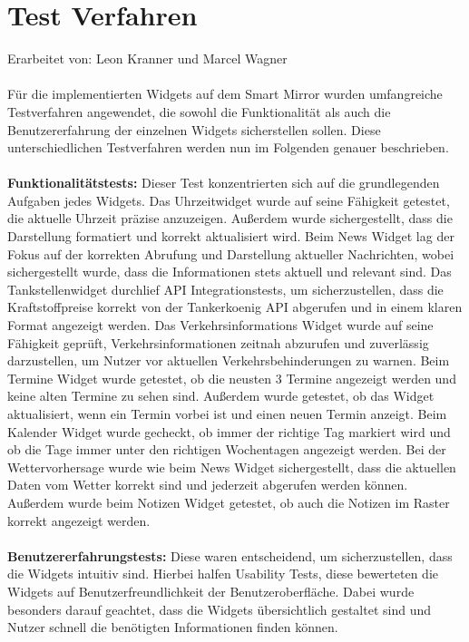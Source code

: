 \newpage

\section{Test Verfahren}
Erarbeitet von: Leon Kranner und Marcel Wagner \\ \\
\noindent
Für die implementierten Widgets auf dem Smart Mirror wurden umfangreiche Testverfahren angewendet, die sowohl die Funktionalität als auch die Benutzererfahrung der einzelnen Widgets sicherstellen sollen. Diese unterschiedlichen Testverfahren werden nun im Folgenden genauer beschrieben. \\ \\
\noindent
\textbf{Funktionalitätstests:} Dieser Test konzentrierten sich auf die grundlegenden Aufgaben jedes Widgets. Das Uhrzeitwidget wurde auf seine Fähigkeit getestet, die aktuelle Uhrzeit präzise anzuzeigen. Außerdem wurde sichergestellt, dass die Darstellung formatiert und korrekt aktualisiert wird. Beim News Widget lag der Fokus auf der korrekten Abrufung und Darstellung aktueller Nachrichten, wobei sichergestellt wurde, dass die Informationen stets aktuell und relevant sind. Das Tankstellenwidget durchlief API Integrationstests, um sicherzustellen, dass die Kraftstoffpreise korrekt von der Tankerkoenig API abgerufen und in einem klaren Format angezeigt werden. Das Verkehrsinformations Widget wurde auf seine Fähigkeit geprüft, Verkehrsinformationen zeitnah abzurufen und zuverlässig darzustellen, um Nutzer vor aktuellen Verkehrsbehinderungen zu warnen. Beim Termine Widget wurde getestet, ob die neusten 3 Termine angezeigt werden und keine alten Termine zu sehen sind. Außerdem wurde getestet, ob das Widget aktualisiert, wenn ein Termin vorbei ist und einen neuen Termin anzeigt. Beim Kalender Widget wurde gecheckt, ob immer der richtige Tag markiert wird und ob die Tage immer unter den richtigen Wochentagen angezeigt werden. Bei der Wettervorhersage wurde wie beim News Widget sichergestellt, dass die aktuellen Daten vom Wetter korrekt sind und jederzeit abgerufen werden können.  Außerdem wurde beim Notizen Widget getestet, ob auch die Notizen im Raster korrekt angezeigt werden.\\ \\
\noindent
\textbf{Benutzererfahrungstests:} Diese waren entscheidend, um sicherzustellen, dass die Widgets intuitiv sind. Hierbei halfen Usability Tests, diese bewerteten die Widgets auf Benutzerfreundlichkeit der Benutzeroberfläche. Dabei wurde besonders darauf geachtet, dass die Widgets übersichtlich gestaltet sind und Nutzer schnell die benötigten Informationen finden können. \\ \\
